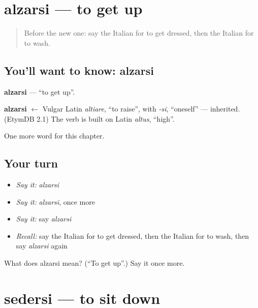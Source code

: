 \section[alzarsi]{alzarsi — to get up}

\label{lesson:IT-C134-alzarsi}



\begin{quote}
Before the new one: say the Italian for to get dressed, then the Italian for to wash.
\end{quote}

\subsection*{You'll want to know: alzarsi}
\textbf{alzarsi} — \textquotedblleft{}to get up\textquotedblright{}.

\begin{cousinweb}
\textbf{alzarsi} $\leftarrow$ Vulgar Latin \emph{altiare}, \textquotedblleft{}to raise\textquotedblright{}, with \emph{-si}, \textquotedblleft{}oneself\textquotedblright{} — inherited. (EtymDB 2.1) The verb is built on Latin \emph{altus}, \textquotedblleft{}high\textquotedblright{}.
\end{cousinweb}

\begin{grammarlens}[title={What you've built}]
One more word for this chapter.
\end{grammarlens}

\subsection*{Your turn}
\begin{itemize}
\raggedright
  \item \emph{Say it:} \emph{alzarsi}
  \item \emph{Say it:} \emph{alzarsi}, once more
  \item \emph{Say it:} say \emph{alzarsi}
  \item \emph{Recall:} say the Italian for to get dressed, then the Italian for to wash, then say \emph{alzarsi} again
\end{itemize}

\begin{tcolorbox}[breakable,colback=teal!4,colframe=teal!35!black,title={Before you move on}]
What does alzarsi mean? (\textquotedblleft{}To get up\textquotedblright{}.) Say it once more.
\end{tcolorbox}
\section[sedersi]{sedersi — to sit down}

